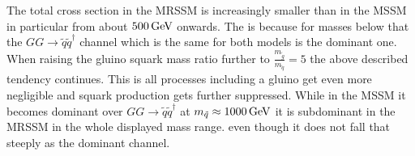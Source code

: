 The total cross section in the MRSSM is increasingly smaller than in the MSSM in particular from about $\unit[500]{GeV}$ onwards. The is because for masses below that the $GG \to \tilde{q}\tilde{q}^\dagger$ channel which is the same for both models is the dominant one.\\
When raising the gluino squark mass ratio further to $\frac{m_{\tilde{g}}}{m_{\tilde{q}}} = 5$ the above described tendency continues. This is all processes including a gluino get even more negligible and squark production gets further suppressed. While in the MSSM it becomes dominant over $GG \to \tilde{q}\tilde{q}^\dagger$ at $m_{\tilde{q}} \approx \unit[1000]{GeV}$ it is subdominant in the MRSSM in the whole displayed mass range. even though it does not fall that steeply as the dominant channel.\\

